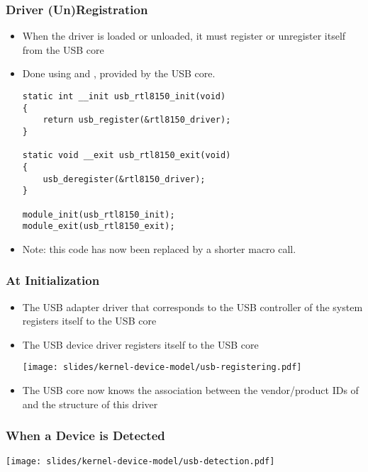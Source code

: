 \begin{frame}[fragile]
  \frametitle{Driver (Un)Registration}
  \begin{itemize}
  \item When the driver is loaded or unloaded, it must register or
    unregister itself from the USB core
  \item Done using  and ,
    provided by the USB core.
\begin{verbatim}
static int __init usb_rtl8150_init(void)
{
    return usb_register(&rtl8150_driver);
}

static void __exit usb_rtl8150_exit(void)
{
    usb_deregister(&rtl8150_driver);
}

module_init(usb_rtl8150_init);
module_exit(usb_rtl8150_exit);
\end{verbatim}
\item Note: this code has now been replaced by a shorter
   macro call.
  \end{itemize}
\end{frame}

\begin{frame}
  \frametitle{At Initialization}
  \begin{itemize}
  \item The USB adapter driver that corresponds to the USB controller
    of the system registers itself to the USB core
  \item The  USB device driver registers itself to the USB core
    \begin{center}
      \texttt{[image: slides/kernel-device-model/usb-registering.pdf]}
    \end{center}
  \item The USB core now knows the association between the
    vendor/product IDs of  and the  structure
    of this driver
  \end{itemize}
\end{frame}

\begin{frame}
  \frametitle{When a Device is Detected}
  \begin{center}
    \texttt{[image: slides/kernel-device-model/usb-detection.pdf]}
  \end{center}
\end{frame}

